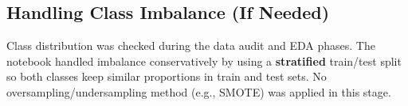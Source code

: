 \subsection{Handling Class Imbalance (If Needed)}
Class distribution was checked during the data audit and EDA phases. The notebook handled imbalance conservatively by using a \textbf{stratified} train/test split so both classes keep similar proportions in train and test sets. No oversampling/undersampling method (e.g., SMOTE) was applied in this stage.
